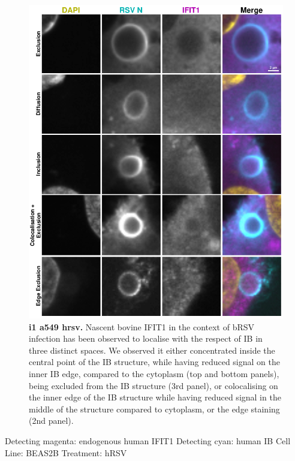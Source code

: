 \begin{figure}
    \centering
    \includegraphics[width=1\linewidth]{09. Chapter 4/Figs/02. Infection/01. IFIT1/03. a549 i1.pdf}
    \caption[i1 a549 hrsv]{\textbf{i1 a549 hrsv.} Nascent bovine IFIT1 in the context of bRSV infection has been observed to localise with the respect of IB in three distinct spaces. We observed it either concentrated inside the central point of the IB structure, while having reduced signal on the inner IB edge, compared to the cytoplasm (top and bottom panels), being excluded from the IB structure (3rd panel), or colocalising on the inner edge of the IB structure while having reduced signal in the middle of the structure compared to cytoplasm, or the edge staining (2nd panel).}
    \label{fig:i1 a549 hrsv}
\end{figure}


Detecting magenta: endogenous human IFIT1 \newline
Detecting cyan: human IB \newline
Cell Line: BEAS2B \newline
Treatment: hRSV \newline

